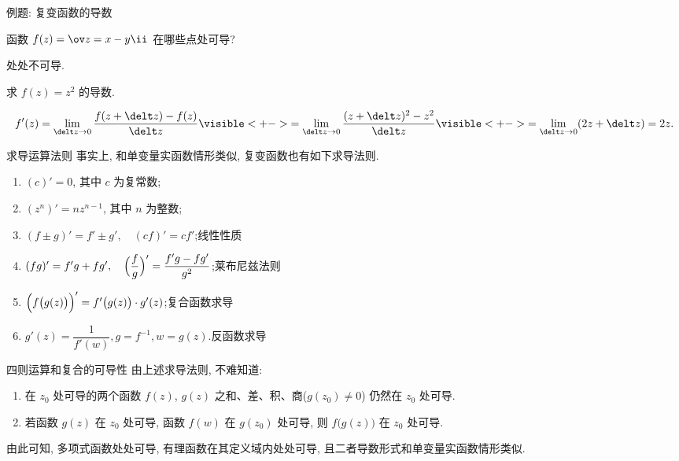 \begin{frame}{例题: 复变函数的导数}
	\onslide<+->
	\begin{exercise}[nearnext]
		函数 $f(z)=\ov z=x-y\ii$ 在哪些点处可导? 
	\end{exercise}
	\onslide<+->
	\begin{answer}[nearprev]
		处处不可导.
	\end{answer}
	\onslide<+->
	\begin{example}[nearnext]
		求 $f(z)=z^2$ 的导数.
	\end{example}
	\onslide<+->
	\begin{solution}[nearprev]
		\bigdel
		\[
			f'(z)=\lim_{\delt z\to 0}\frac{f(z+\delt z)-f(z)}{\delt z}
			\visible<+->{=\lim_{\delt z\to 0}\frac{(z+\delt z)^2-z^2}{\delt z}}
			\visible<+->{=\lim_{\delt z\to 0}(2z+\delt z)=2z.}
		\]\bigdel
	\end{solution}
\end{frame}


\begin{frame}{求导运算法则}
	\onslide<+->
	事实上, 和单变量实函数情形类似, 复变函数也有如下求导法则.
	\onslide<+->
	\begin{theorem}
		\begin{enumerate}
			\item $(c)'=0$, 其中 $c$ 为复常数;
			\item $(z^n)'=nz^{n-1}$, 其中 $n$ 为整数;
			\item $(f\pm g)'=f'\pm g',\quad (cf)'=cf'$;\hfill\alert{线性性质}
			\item $(fg)'=f'g+fg',\quad \Bigl(\dfrac fg\Bigr)'=\dfrac{f'g-fg'}{g^2}$;\hfill\alert{莱布尼兹法则}
			\item $\Bigl(f\bigl(g(z)\bigr)\Bigr)'=f'\bigl(g(z)\bigr)\cdot g'(z)$;\hfill\alert{复合函数求导}
			\item $g'(z)=\dfrac1{f'(w)}, g=f^{-1}, w=g(z)$.\hfill\alert{反函数求导}
		\end{enumerate}
	\end{theorem}
\end{frame}


\begin{frame}{四则运算和复合的可导性}
	\onslide<+->
	由上述求导法则, 不难知道:
	\onslide<+->
	\begin{theorem}
		\begin{enumerate}
			\item 在 $z_0$ 处可导的两个函数 $f(z)$, $g(z)$ 之和、差、积、商($g(z_0)\neq 0$) 仍然在 $z_0$ 处可导.
			\item 若函数 $g(z)$ 在 $z_0$ 处可导, 函数 $f(w)$ 在 $g(z_0)$ 处可导, 则 $f\bigl(g(z)\bigr)$ 在 $z_0$ 处可导.
		\end{enumerate}
	\end{theorem}
	\onslide<+->
	由此可知, 多项式函数处处可导, 有理函数在其定义域内处处可导, 且二者导数形式和单变量实函数情形类似.
\end{frame}


